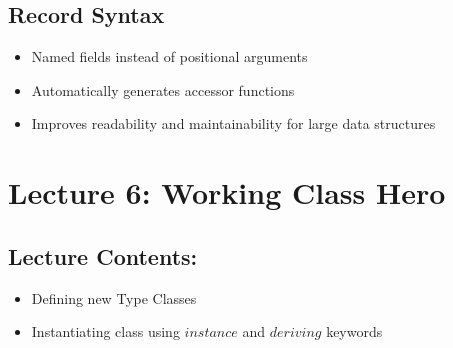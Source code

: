 \documentclass[11pt,twoside=off,openright,numbers=noenddot]{scrbook}
\begin{document}
\section{Record Syntax}
\label{sec:org02b8590}
\begin{itemize}
\item Named fields instead of positional arguments
\item Automatically generates accessor functions
\item Improves readability and maintainability for large data structures
\end{itemize}
\chapter{Lecture 6: Working Class Hero}
\label{sec:orgdf1f69f}

\section{Lecture Contents:}
\label{sec:orgc321b0a}
\begin{itemize}
\item Defining new Type Classes
\item Instantiating class using \(instance\) and \(deriving\) keywords
\end{itemize}
\end{document}
